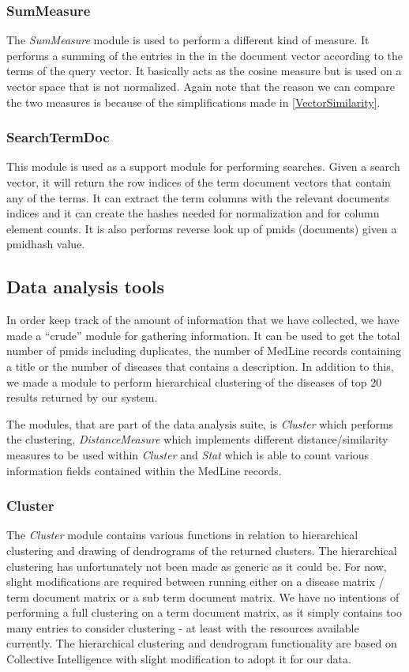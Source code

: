 \subsubsection{SumMeasure}
The \textit{SumMeasure} module is used to perform a different kind of
measure. It performs a summing of the entries in the in the document
vector according to the terms of the query vector. It basically acts
as the cosine measure but is used on a vector space that is not
normalized. Again note that the reason we can compare the two measures
is because of the simplifications made in \ref{VectorSimilarity}.

\subsubsection{SearchTermDoc}
This module is used as a support module for performing searches. Given
a search vector, it will return the row indices of the term document
vectors that contain any of the terms. It can extract the term columns
with the relevant documents indices and it can create the hashes
needed for normalization and for column element counts. It is also
performs reverse look up of pmids (documents) given a pmidhash value.

\subsection{Data analysis tools}

In order keep track of the amount of information that we have
collected, we have made a ``crude'' module for gathering information. It
can be used to get the total number of pmids including duplicates, the
number of MedLine records containing a title or the number of diseases
that contains a description. In addition to this, we made a module to
perform hierarchical clustering of the diseases of top 20 results
returned by our system.

The modules, that are part of the data analysis suite, is
\textit{Cluster} which performs the clustering,
\textit{DistanceMeasure} which implements different
distance/similarity measures to be used within \textit{Cluster} and
\textit{Stat} which is able to count various information fields
contained within the MedLine records.

\subsubsection{Cluster}
The \textit{Cluster} module contains various functions in relation to
hierarchical clustering and drawing of dendrograms of the returned
clusters. The hierarchical clustering has unfortunately not been made
as generic as it could be. For now, slight modifications are required
between running either on a disease matrix / term document matrix or a
sub term document matrix. We have no intentions of performing a full
clustering on a term document matrix, as it simply contains too many
entries to consider clustering - at least with the resources available
currently. The hierarchical clustering and dendrogram functionality
are based on Collective Intelligence \cite{CollectiveIntelligence}
with slight modification to adopt it for our data.

